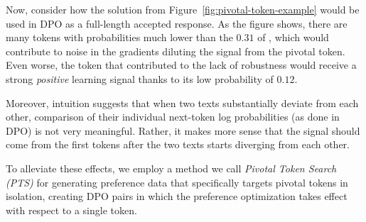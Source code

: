 \documentclass[11pt]{article}
\begin{document}
Now, consider how the solution from Figure~\ref{fig:pivotal-token-example} would be used in DPO as a full-length accepted response. As the figure shows, there are many tokens with probabilities much lower than the $0.31$ of , which would contribute to noise in the gradients diluting the signal from the pivotal token. Even worse, the token  that contributed to the lack of robustness would receive a strong \emph{positive} learning signal thanks to its low probability of $0.12$. 

Moreover, intuition suggests that when two texts substantially deviate from each other, comparison of their individual next-token log probabilities (as done in DPO) is not very meaningful. Rather, it makes more sense that the signal should come from the first tokens after the two texts starts diverging from each other. 

To alleviate these effects, we employ a method we call \emph{Pivotal Token Search (PTS)} for generating preference data that specifically targets pivotal tokens in isolation, creating DPO pairs in which the preference optimization takes effect with respect to a single token.
\end{document}
